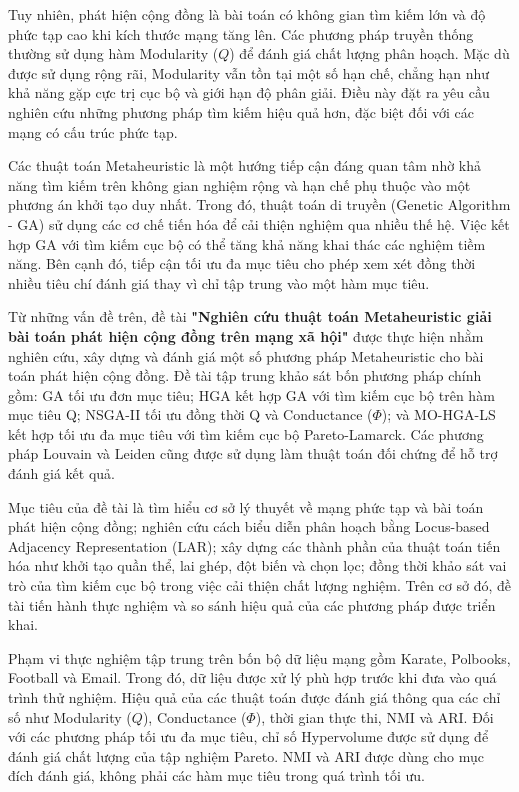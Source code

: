 \documentclass[14pt,a4paper]{extarticle}
\begin{document}
Tuy nhiên, phát hiện cộng đồng là bài toán có không gian tìm kiếm lớn và độ phức tạp cao khi kích thước mạng tăng lên. Các phương pháp truyền thống thường sử dụng hàm Modularity ($Q$) để đánh giá chất lượng phân hoạch. Mặc dù được sử dụng rộng rãi, Modularity vẫn tồn tại một số hạn chế, chẳng hạn như khả năng gặp cực trị cục bộ và giới hạn độ phân giải. Điều này đặt ra yêu cầu nghiên cứu những phương pháp tìm kiếm hiệu quả hơn, đặc biệt đối với các mạng có cấu trúc phức tạp.

Các thuật toán Metaheuristic là một hướng tiếp cận đáng quan tâm nhờ khả năng tìm kiếm trên không gian nghiệm rộng và hạn chế phụ thuộc vào một phương án khởi tạo duy nhất. Trong đó, thuật toán di truyền (Genetic Algorithm - GA) sử dụng các cơ chế tiến hóa để cải thiện nghiệm qua nhiều thế hệ. Việc kết hợp GA với tìm kiếm cục bộ có thể tăng khả năng khai thác các nghiệm tiềm năng. Bên cạnh đó, tiếp cận tối ưu đa mục tiêu cho phép xem xét đồng thời nhiều tiêu chí đánh giá thay vì chỉ tập trung vào một hàm mục tiêu.

Từ những vấn đề trên, đề tài \textbf{"Nghiên cứu thuật toán Metaheuristic giải bài toán phát hiện cộng đồng trên mạng xã hội"} được thực hiện nhằm nghiên cứu, xây dựng và đánh giá một số phương pháp Metaheuristic cho bài toán phát hiện cộng đồng. Đề tài tập trung khảo sát bốn phương pháp chính gồm: GA tối ưu đơn mục tiêu; HGA kết hợp GA với tìm kiếm cục bộ trên hàm mục tiêu Q; NSGA-II tối ưu đồng thời Q và Conductance ($\Phi$); và MO-HGA-LS kết hợp tối ưu đa mục tiêu với tìm kiếm cục bộ Pareto-Lamarck. Các phương pháp Louvain và Leiden cũng được sử dụng làm thuật toán đối chứng để hỗ trợ đánh giá kết quả.

Mục tiêu của đề tài là tìm hiểu cơ sở lý thuyết về mạng phức tạp và bài toán phát hiện cộng đồng; nghiên cứu cách biểu diễn phân hoạch bằng Locus-based Adjacency Representation (LAR); xây dựng các thành phần của thuật toán tiến hóa như khởi tạo quần thể, lai ghép, đột biến và chọn lọc; đồng thời khảo sát vai trò của tìm kiếm cục bộ trong việc cải thiện chất lượng nghiệm. Trên cơ sở đó, đề tài tiến hành thực nghiệm và so sánh hiệu quả của các phương pháp được triển khai.

Phạm vi thực nghiệm tập trung trên bốn bộ dữ liệu mạng gồm Karate, Polbooks, Football và Email. Trong đó, dữ liệu được xử lý phù hợp trước khi đưa vào quá trình thử nghiệm. Hiệu quả của các thuật toán được đánh giá thông qua các chỉ số như Modularity ($Q$), Conductance ($\Phi$), thời gian thực thi, NMI và ARI. Đối với các phương pháp tối ưu đa mục tiêu, chỉ số Hypervolume được sử dụng để đánh giá chất lượng của tập nghiệm Pareto. NMI và ARI được dùng cho mục đích đánh giá, không phải các hàm mục tiêu trong quá trình tối ưu.
\end{document}
